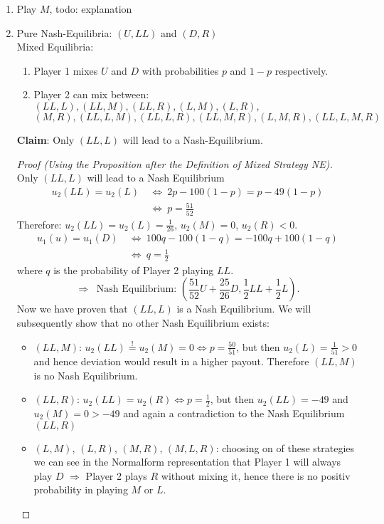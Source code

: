 \documentclass[12pt]{extreport} %
\theoremstyle{named}
\theoremstyle{itshape}
\theoremstyle{normal}
\begin{document}
\begin{enumerate}
	\item Play $M$, todo: explanation
	\item Pure Nash-Equilibria: $(U, LL)$ and $(D, R)$ ~\\
		Mixed Equilibria: 
		\begin{enumerate}
			\item Player 1 mixes $U$ and $D$ with probabilities $p$ and $1 -p$ respectively.
			\item Player 2 can mix between: $(LL, L), (LL, M), (LL, R), (L, M), (L, R),$
				$$ (M, R), (LL, L, M), (LL, L, R), (LL, M, R), (L, M, R), (LL, L, M, R) $$
		\end{enumerate}
		\textbf{Claim}: Only $(LL, L)$ will lead to a Nash-Equilibrium.
			\begin{proof}[Proof (Using the Proposition after the Definition of Mixed Strategy NE)] ~\\
				Only $(LL, L)$ will lead to a Nash Equilibrium
				\begin{align*}
					u_{2}(LL) = u_{2}(L) ~ & \iff ~ 2p - 100 (1-p) = p - 49 (1-p) \\
					& \iff ~p = \frac{51}{52}
				\end{align*} 
				Therefore: $u_{2}(LL) = u_{2}(L) = \frac{1}{26}$, $u_{2}(M) = 0$, $u_{2}(R) < 0$.
				\begin{align*}
					u_{1}(u) = u_{1}(D)  ~ & \iff ~ 100q - 100(1-q) = -100q + 100(1-q) \\
					& \iff ~ q = \frac{1}{2}
				\end{align*} 
				where $q$ is the probability of Player 2 playing $LL$.~\\
				$$ \Rightarrow ~ \text{ Nash Equilibrium: } \left( \frac{51}{52} U + \frac{25}{26} D, \frac{1}{2} LL + \frac{1}{2} L \right). $$
				Now we have proven that $(LL, L)$ is a Nash Equilibrium. We will subsequently show that no other Nash Equilibrium exists:
				\begin{itemize}
					\item $(LL, M)$: $u_{2}(LL) \overset{!}{=} u_{2}(M) = 0 \iff p = \frac{50}{51}$, but then $u_{2}(L) = \frac{1}{51} > 0$ and hence deviation would result in a higher payout. Therefore $(LL, M)$ is no Nash Equilibrium.
					\item $(LL, R)$: $u_{2}(LL) = u_{2}(R) \iff p = \frac{1}{2}$, but then $u_{2}(LL) = - 49$ and $u_{2}(M) = 0 > - 49$ and again a contradiction to the Nash Equilibrium $(LL, R)$
					\item $(L, M)$, $(L, R)$, $(M, R)$, $(M, L, R)$: choosing on of these strategies we can see in the Normalform representation that Player 1 will always play $D$ $\Rightarrow$ Player 2 plays $R$ without mixing it, hence there is no positiv probability in playing $M$ or $L$.

\end{itemize}
\end{proof}
\end{enumerate}
\end{document}
